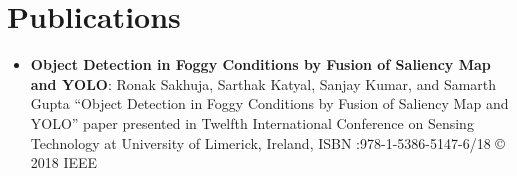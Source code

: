 \documentclass[letterpaper,11pt]{article}
\newcommand{\resumeItem}[2]{
  \item\small{
    \textbf{#1}{: #2 \vspace{2pt}}
  }
}
\newcommand{\resumeSubItem}[2]{\resumeItem{#1}{#2}\vspace{-6pt}}
\newcommand{\resumeSubHeadingListStart}{\begin{itemize}[leftmargin=*]}
\newcommand{\resumeSubHeadingListEnd}{\end{itemize}}
\begin{document}
\section{Publications}
    \resumeSubHeadingListStart
        \resumeSubItem
        {Object Detection in Foggy Conditions by Fusion of Saliency Map and YOLO}
        {Ronak Sakhuja, Sarthak Katyal, Sanjay Kumar, and Samarth Gupta “Object Detection in Foggy Conditions by  Fusion  of  Saliency  Map  and  YOLO”  paper  presented  in  Twelfth  International  Conference  on  Sensing Technology at University of Limerick, Ireland, ISBN :978-1-5386-5147-6/18 © 2018 IEEE }
    \resumeSubHeadingListEnd
\end{document}
